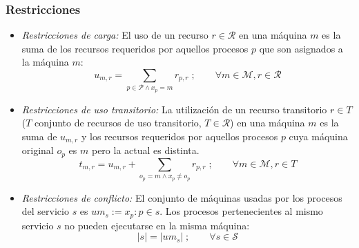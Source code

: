 \subsubsection{Restricciones}
\begin{itemize}
	\item \textit{Restricciones de carga:} El uso de un recurso $r \in \mathcal{R}$ en una máquina $m$ es la suma de los recursos requeridos por aquellos procesos $p$ que son asignados a la máquina $m$:
		\begin{equation}\label{modelo2:r1}
			u_{m,r} = \sum_{p \in \mathcal{P} \wedge x_p = m}r_{p,r}\;; \qquad \forall m \in \mathcal{M}, r \in \mathcal{R}
		\end{equation} 
	
	\item \textit{Restricciones de uso transitorio:} La utilización de un recurso transitorio $r \in T$ ($T$ conjunto de recursos de uso transitorio, $T \in \mathcal{R}$) en una máquina $m$ es la suma de $u_{m,r}$ y los recursos requeridos por aquellos procesos $p$ cuya máquina original $o_p$ es $m$ pero la actual es distinta.
		\begin{equation}\label{modelo2:r2}
			t_{m,r} = u_{m,r} + \sum_{o_p=m \wedge x_p \neq o_p}r_{p,r}\;; \qquad \forall m \in \mathcal{M}, r \in T
		\end{equation}
		
	\item \textit{Restricciones de conflicto:} El conjunto de máquinas usadas por los procesos del servicio $s$ es $um_s := {x_p:p \in s}$. Los procesos pertenecientes al mismo servicio $s$ no pueden ejecutarse en la misma máquina:
		\begin{equation}\label{modelo2:r3}
			|s| = |um_s|\;; \qquad \forall s \in \mathcal{S}
		\end{equation}
	

\end{itemize}

